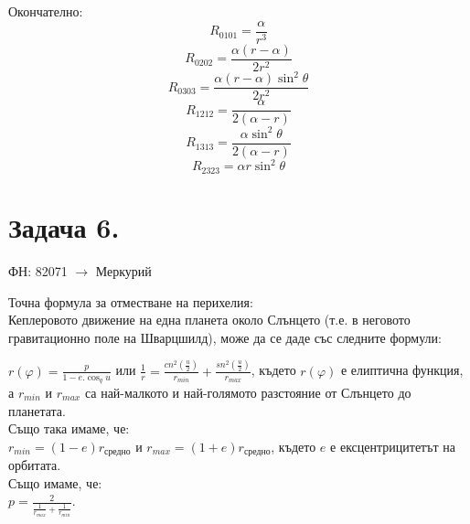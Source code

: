 \documentclass[a4paper,12pt]{article}
\begin{document}
    Окончателно: 
    \begin{equation*}
        R_{0101} = \frac{\alpha}{r^3} 
    \end{equation*}
    \begin{equation*}
        R_{0202} = \frac{\alpha(r-\alpha)}{2r^2} 
    \end{equation*}
    \begin{equation*}
        R_{0303} = \frac{\alpha(r-\alpha)\sin^2\theta}{2r^2} 
    \end{equation*}
    \begin{equation*}
        R_{1212} = \frac{\alpha}{2(\alpha-r)} 
    \end{equation*}
    \begin{equation*}
        R_{1313} = \frac{\alpha\sin^2\theta}{2(\alpha-r)} 
    \end{equation*}
    \begin{equation*}
        R_{2323} = \alpha r\sin^2\theta
    \end{equation*}

    \section*{Задача 6.}
    ФН: 82071 $\rightarrow$ Меркурий

    Точна формула за отместване на перихелия: \\
    Кеплеровото движение на една планета около Слънцето (т.е. в неговото гравитационно поле на Шварцшилд), може да се даде със следните 
    формули:

    $
        r(\varphi) = \frac{p}{1-e.\cos_q u}
    $
    или 
    $
        \frac{1}{r} = \frac{cn^2(\frac{u}{2})}{r_{min}} + \frac{sn^2(\frac{u}{2})}{r_{max}}
    $, 
    където $r(\varphi)$ е елиптична функция, а $r_{min}$ и $r_{max}$ са най-малкото и най-голямото
    разстояние от Слънцето до планетата. \\ Също така имаме, че: \\
    $
        r_{min} = (1-e)r_{\text{средно}}
    $ и 
    $
        r_{max}=(1+e)r_{\text{средно}}
    $, където $e$ е ексцентрицитетът на орбитата.
    \\ Също имаме, че: \\
    $p = \frac{2}{\frac{1}{r_{max}} + \frac{1}{r_{min}}}$.
\end{document}
